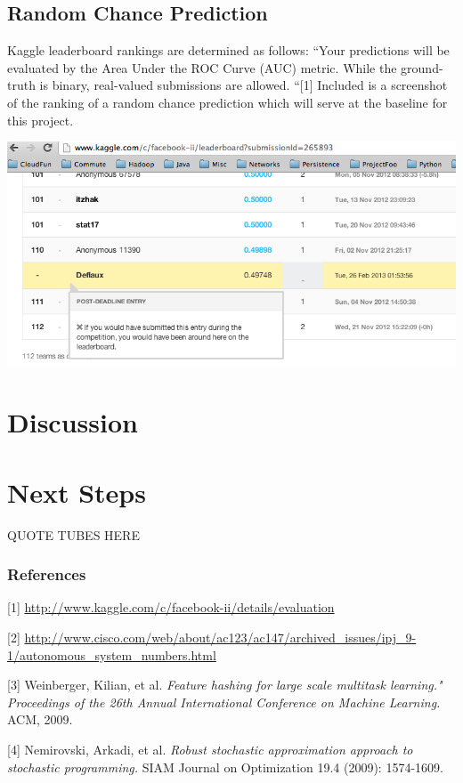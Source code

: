 \documentclass{article} %
\begin{document}
\subsection{Random Chance Prediction}

Kaggle leaderboard rankings are determined as follows: ``Your predictions
will be evaluated by the Area Under the ROC Curve (AUC) metric.  While the
ground-truth is binary, real-valued submissions are allowed. ``[1]  Included
is a screenshot of the ranking of a random chance prediction which will
serve at the baseline for this project.

  \begin{center}
    \includegraphics[scale=.4]{randomPredictions.png}
  \end{center}

\section{Discussion}

\section{Next Steps}

QUOTE TUBES HERE

\subsubsection*{References}

\small{
[1] \url{http://www.kaggle.com/c/facebook-ii/details/evaluation}

[2] \url{http://www.cisco.com/web/about/ac123/ac147/archived_issues/ipj_9-1/autonomous_system_numbers.html}

[3] Weinberger, Kilian, et al. {\it Feature hashing for large scale multitask learning." Proceedings of the 26th Annual International Conference on Machine Learning.} ACM, 2009.

[4] Nemirovski, Arkadi, et al. {\it Robust stochastic approximation approach to stochastic programming.} SIAM Journal on Optimization 19.4 (2009): 1574-1609.
}
\end{document}
